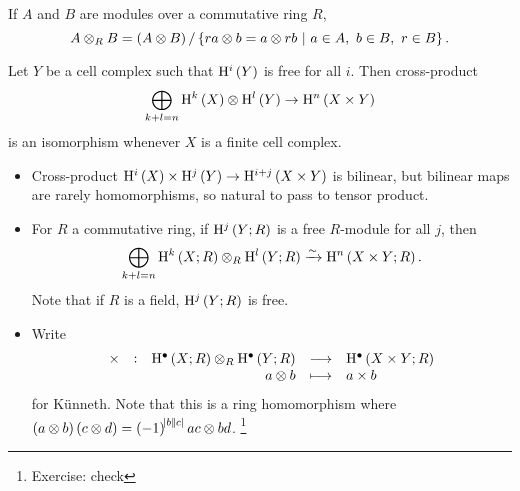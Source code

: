 \begin{remark*}
If $ A $ and $ B $ are modules over a commutative ring $ R $,
$$ A \otimes_R B = \br{A \otimes B} / \cbr{ra \otimes b = a \otimes rb \st a \in A, \ b \in B, \ r \in B}. $$
\end{remark*}

\begin{theorem}
\label{thm:kunneththeorem}
Let $ Y $ be a cell complex such that $ \H^i\br{Y} $ is free for all $ i $. Then cross-product
$$ \bigoplus_{k + l = n} \H^k\br{X} \otimes \H^l\br{Y} \to \H^n\br{X \times Y} $$
is an isomorphism whenever $ X $ is a finite cell complex.
\end{theorem}

\begin{remark*}
\hfill
\begin{itemize}
\item Cross-product $ \H^i\br{X} \times \H^j\br{Y} \to \H^{i + j}\br{X \times Y} $ is bilinear, but bilinear maps are rarely homomorphisms, so natural to pass to tensor product.
\item For $ R $ a commutative ring, if $ \H^j\br{Y; R} $ is a free $ R $-module for all $ j $, then
$$ \bigoplus_{k + l = n} \H^k\br{X; R} \otimes_R \H^l\br{Y; R} \xrightarrow{\sim} \H^n\br{X \times Y; R}. $$
Note that if $ R $ is a field, $ \H^j\br{Y; R} $ is free.
\item Write
$$ \function[\times]{\H^\bullet\br{X; R} \otimes_R \H^\bullet\br{Y; R}}{\H^\bullet\br{X \times Y; R}}{a \otimes b}{a \times b} $$
for K\"unneth. Note that this is a ring homomorphism where $ \br{a \otimes b}\br{c \otimes d} = \br{-1}^{\abs{b}\abs{c}}ac \otimes bd $. \footnote{Exercise: check}
\end{itemize}
\end{remark*}

\pagebreak

